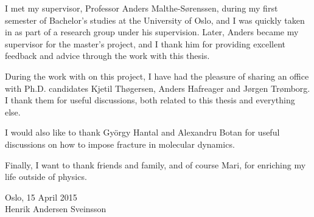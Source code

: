 \begin{acknowledgements}
I met my supervisor, Professor Anders Malthe-Sørenssen, during my first semester of Bachelor's studies at the University of Oslo, and I was quickly taken in as part of a research group under his supervision. Later, Anders became my supervisor for the master's project, and I thank him for providing excellent feedback and advice through the work with this thesis. 

During the work with on this project, I have had the pleasure of sharing an office with Ph.D. candidates Kjetil Thøgersen, Anders Hafreager and Jørgen Trømborg. I thank them for useful discussions, both related to this thesis and everything else. 

I would also like to thank Gy\"orgy Hantal and Alexandru Botan for useful discussions on how to impose  fracture in molecular dynamics.

Finally, I want to thank friends and family, and of course Mari, for enriching my life outside of physics.
\begin{flushright}
Oslo, 15 April 2015 \\
Henrik Andersen Sveinsson
\end{flushright}
\end{acknowledgements}
